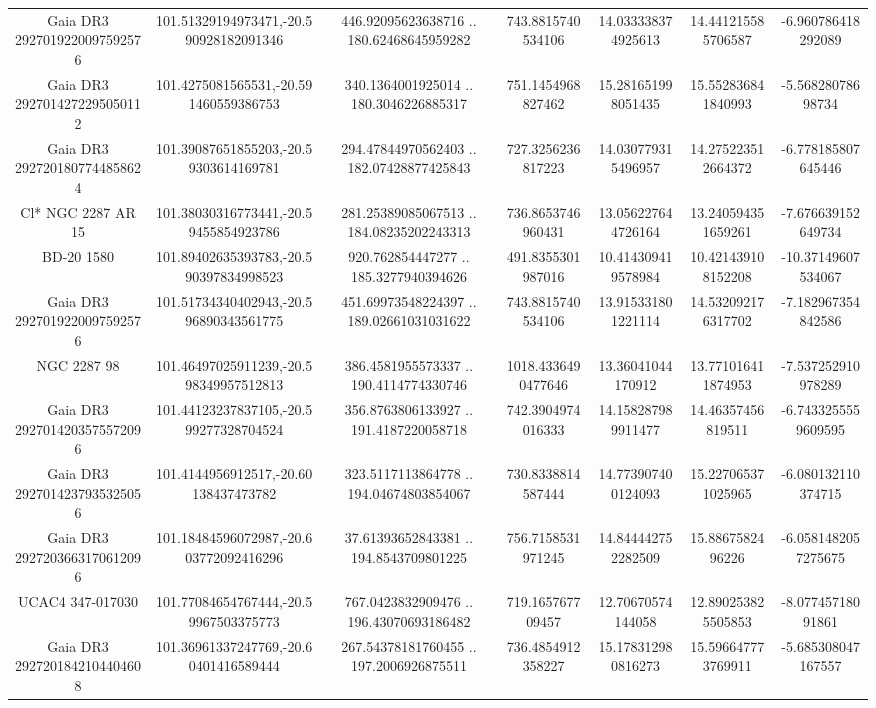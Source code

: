 \begin{table}
\begin{tabular}{ccccccc}
Gaia DR3 2927019220097592576 & 101.51329194973471,-20.590928182091346 & 446.92095623638716 .. 180.62468645959282 & 743.8815740534106 & 14.033338374925613 & 14.441215585706587 & -6.960786418292089 \\
Gaia DR3 2927014272295050112 & 101.4275081565531,-20.591460559386753 & 340.1364001925014 .. 180.3046226885317 & 751.1454968827462 & 15.281651998051435 & 15.552836841840993 & -5.56828078698734 \\
Gaia DR3 2927201807744858624 & 101.39087651855203,-20.59303614169781 & 294.47844970562403 .. 182.07428877425843 & 727.3256236817223 & 14.030779315496957 & 14.275223512664372 & -6.778185807645446 \\
Cl* NGC 2287     AR      15 & 101.38030316773441,-20.59455854923786 & 281.25389085067513 .. 184.08235202243313 & 736.8653746960431 & 13.056227644726164 & 13.240594351659261 & -7.676639152649734 \\
BD-20  1580 & 101.89402635393783,-20.590397834998523 & 920.762854447277 .. 185.3277940394626 & 491.8355301987016 & 10.414309419578984 & 10.421439108152208 & -10.37149607534067 \\
Gaia DR3 2927019220097592576 & 101.51734340402943,-20.596890343561775 & 451.69973548224397 .. 189.02661031031622 & 743.8815740534106 & 13.915331801221114 & 14.532092176317702 & -7.182967354842586 \\
NGC  2287    98 & 101.46497025911239,-20.598349957512813 & 386.4581955573337 .. 190.4114774330746 & 1018.4336490477646 & 13.36041044170912 & 13.771016411874953 & -7.537252910978289 \\
Gaia DR3 2927014203575572096 & 101.44123237837105,-20.599277328704524 & 356.8763806133927 .. 191.4187220058718 & 742.3904974016333 & 14.158287989911477 & 14.46357456819511 & -6.7433255559609595 \\
Gaia DR3 2927014237935325056 & 101.4144956912517,-20.60138437473782 & 323.5117113864778 .. 194.04674803854067 & 730.8338814587444 & 14.773907400124093 & 15.227065371025965 & -6.080132110374715 \\
Gaia DR3 2927203663170612096 & 101.18484596072987,-20.603772092416296 & 37.61393652843381 .. 194.8543709801225 & 756.7158531971245 & 14.844442752282509 & 15.8867582496226 & -6.0581482057275675 \\
UCAC4 347-017030 & 101.77084654767444,-20.59967503375773 & 767.0423832909476 .. 196.43070693186482 & 719.165767709457 & 12.70670574144058 & 12.890253825505853 & -8.07745718091861 \\
Gaia DR3 2927201842104404608 & 101.36961337247769,-20.60401416589444 & 267.54378181760455 .. 197.2006926875511 & 736.4854912358227 & 15.178312980816273 & 15.596647773769911 & -5.685308047167557 \\

\end{tabular}
\end{table}
